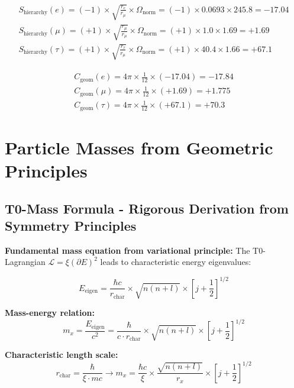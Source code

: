 \documentclass[12pt,a4paper]{article}
\numberwithin{equation}{section}
\newcommand{\xipar}{\xi}
\newcommand{\Cgeom}{C_{\text{geom}}}
\newcommand{\calL}{\mathcal{L}}
\newcommand{\Omegafactor}{\Omega}
\begin{document}
	\begin{align}
		S_{\text{hierarchy}}(e) = (-1) \times \sqrt{\frac{r_e}{r_\mu}} \times \Omegafactor_{\text{norm}} = (-1) \times 0.0693 \times 245.8 = -17.04\\
		S_{\text{hierarchy}}(\mu) = (+1) \times \sqrt{\frac{r_\mu}{r_\mu}} \times \Omegafactor_{\text{norm}} = (+1) \times 1.0 \times 1.69 = +1.69\\
		S_{\text{hierarchy}}(\tau) = (+1) \times \sqrt{\frac{r_\tau}{r_\mu}} \times \Omegafactor_{\text{norm}} = (+1) \times 40.4 \times 1.66 = +67.1
		\label{eq:signature_factors}
	\end{align}
	
	\begin{align}
		\Cgeom(e) = 4\pi \times \frac{1}{12} \times (-17.04) = -17.84\\
		\Cgeom(\mu) = 4\pi \times \frac{1}{12} \times (+1.69) = +1.775\\
		\Cgeom(\tau) = 4\pi \times \frac{1}{12} \times (+67.1) = +70.3
		\label{eq:cgeom_values}
	\end{align}
	
	\section{Particle Masses from Geometric Principles}
	
	\subsection{T0-Mass Formula - Rigorous Derivation from Symmetry Principles}
	
	\textbf{Fundamental mass equation from variational principle:}
	The T0-Lagrangian $\calL = \xipar(\partial E)^2$ leads to characteristic energy eigenvalues:
	
	\begin{equation}
		E_{\text{eigen}} = \frac{\hbar c}{r_{\text{char}}} \times \sqrt{n(n+l)} \times [j+\frac{1}{2}]^{1/2}
		\label{eq:energy_eigenvalues}
	\end{equation}
	
	\textbf{Mass-energy relation:}
	\begin{equation}
		m_x = \frac{E_{\text{eigen}}}{c^2} = \frac{\hbar}{c \cdot r_{\text{char}}} \times \sqrt{n(n+l)} \times [j+\frac{1}{2}]^{1/2}
		\label{eq:mass_energy}
	\end{equation}
	
	\textbf{Characteristic length scale:}
	\begin{equation}
		r_{\text{char}} = \frac{\hbar}{\xipar \cdot mc} \rightarrow m_x = \frac{\hbar c}{\xipar} \times \frac{\sqrt{n(n+l)}}{r_x} \times [j+\frac{1}{2}]^{1/2}
		\label{eq:characteristic_length}
	\end{equation}
	
\end{document}
